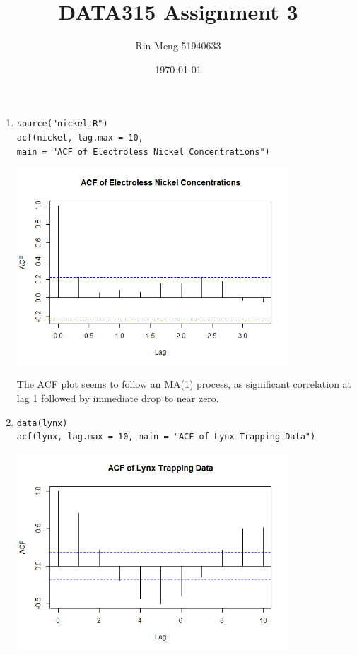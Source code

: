 \documentclass[12pt]{article}
\title{DATA315 Assignment 3}
\author{Rin Meng 51940633}
\date{\today}
\begin{document}
\maketitle

\begin{enumerate}
    \item
    \begin{verbatim}
source("nickel.R")
acf(nickel, lag.max = 10, 
main = "ACF of Electroless Nickel Concentrations")
    \end{verbatim}
    \begin{center}
        \includegraphics[width=0.8\textwidth]{Rplot.png}
    \end{center}
    The ACF plot seems to follow an MA(1) process,
    as significant correlation at lag 1 followed by immediate drop to near zero. 
    \item
\begin{verbatim}
data(lynx)
acf(lynx, lag.max = 10, main = "ACF of Lynx Trapping Data")
\end{verbatim}
    \begin{center}
        \includegraphics[width=0.8\textwidth]{Rplot01.png}

\end{center}
\end{enumerate}
\end{document}

